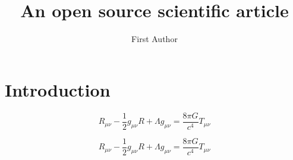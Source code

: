 \documentclass[twocolumn]{aastex631}
\begin{document}
\title{An open source scientific article}

\author[0000-0000-0000-0000]{First Author}

\begin{abstract}
    \blindtext
\end{abstract}

\section{Introduction}
\[
R_{\mu\nu}-\frac{1}{2}g_{\mu\nu}R+\Lambda g_{\mu\nu} = \frac{8\pi G}{c^4}T_{\mu\nu}
\]

\Blindtext[4]

\[
R_{\mu\nu}-\frac{1}{2}g_{\mu\nu}R+\Lambda g_{\mu\nu} = \frac{8\pi G}{c^4}T_{\mu\nu}
\]
\end{document}
